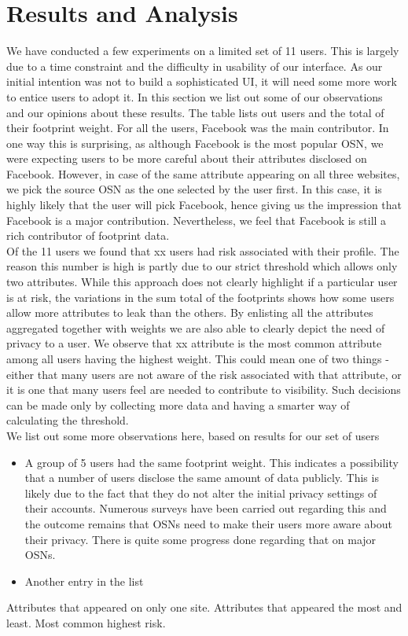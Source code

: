 \documentclass[10pt,conference]{IEEEtran}
\begin{document}
\section{Results and Analysis}
We have conducted a few experiments on a limited set of 11 users. This is largely due to a time constraint and the difficulty in usability of our interface. As our initial intention was not to build a sophisticated UI, it will need some more work to entice users to adopt it. In this section we list out some of our observations and our opinions about these results. The table lists out users and the total of their footprint weight. For all the users, Facebook was the main contributor. In one way this is surprising, as although Facebook is the most popular OSN, we were expecting users to be more careful about their attributes disclosed on Facebook. However, in case of the same attribute appearing on all three websites, we pick the source OSN as the one selected by the user first. In this case, it is highly likely that the user will pick Facebook, hence giving us the impression that Facebook is a major contribution. Nevertheless, we feel that Facebook is still a rich contributor of footprint data. \\
Of the 11 users we found that xx users had risk associated with their profile. The reason this number is high is partly due to our strict threshold which allows only two attributes. While this approach does not clearly highlight if a particular user is at risk, the variations in the sum total of the footprints shows how some users allow more attributes to leak than the others. By enlisting all the attributes aggregated together with weights we are also able to clearly depict the need of privacy to a user. We observe that xx attribute is the most common attribute among all users having the highest weight. This could mean one of two things - either that many users are not aware of the risk associated with that attribute, or it is one that many users feel are needed to contribute to visibility. Such decisions can be made only by collecting more data and having a smarter way of calculating the threshold.\\
We list out some more observations here, based on results for our set of users
\begin{itemize}
\item A group of 5 users had the same footprint weight. This indicates a possibility that a number of users disclose the same amount of data publicly. This is likely due to the fact that they do not alter the initial privacy settings of their accounts. Numerous surveys have been carried out regarding this and the outcome remains that OSNs need to make their users more aware about their privacy. There is quite some progress done regarding that on major OSNs.
\item Another entry in the list
\end{itemize}
Attributes that appeared on only one site.
Attributes that appeared the most and least.
Most common highest risk.
 
\end{document}
